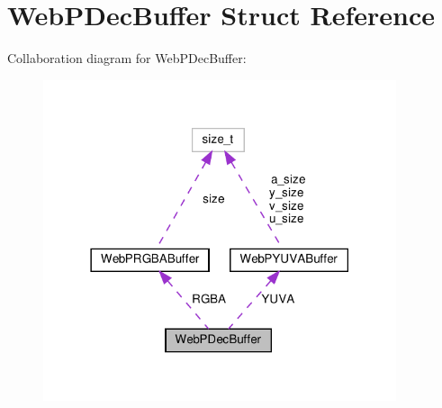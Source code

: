 \hypertarget{structWebPDecBuffer}{}\section{Web\+P\+Dec\+Buffer Struct Reference}
\label{structWebPDecBuffer}


Collaboration diagram for Web\+P\+Dec\+Buffer\+:
\nopagebreak
\begin{figure}[H]
\begin{center}
\leavevmode
\includegraphics[width=294pt]{structWebPDecBuffer__coll__graph}
\end{center}
\end{figure}
